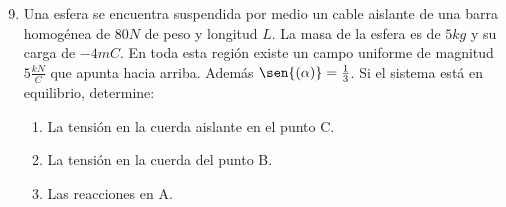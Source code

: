 \documentclass[12pt, twoside]{article}
\begin{document}
\begin{enumerate}
	\setcounter{enumi}{8}
	\item Una esfera se encuentra suspendida por medio un cable aislante
		de una barra homogénea de $80N$ de peso y longitud $L$.
		La masa de la esfera es de $5kg$ y su carga de $-4mC$.
		En toda esta región existe un campo uniforme de magnitud $5 \frac{kN}{C}$
		que apunta hacia arriba.
		Además $\sen{(\alpha)}=\frac{1}{3}$.
		Si el sistema está en equilibrio, determine:
		\begin{enumerate}
			\item La tensión en la cuerda aislante en el punto C.

			\item La tensión en la cuerda del punto B.

			\item Las reacciones en A.
		\end{enumerate}
\end{enumerate}
\end{document}
